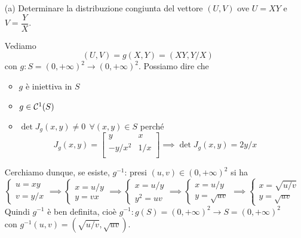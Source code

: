 \Soluzione{}
\begin{enumerate}
\item [(a)] Determinare la distribuzione congiunta del vettore $(U,V)$ ove $U=XY$ e $V=\dfrac{Y}{X}$.

Vediamo
\[
(U,V)=g(X,Y)=(XY,Y/X)
\]
con $g:S=(0,+\infty)^2\to(0,+\infty)^2$. Possiamo dire che
\begin{itemize}
\item $g$ è iniettiva in $S$
\item $g\in\mathcal{C}^1(S)$
\item $\det J_g(x,y)\neq 0\ \ \forall (x,y)\in S$ perché
\[
J_g(x,y)=
\begin{bmatrix}
y & x \\
-y/x^2 & 1/x \\
\end{bmatrix}
\implies \det J_g(x,y)=2y/x
\]
\end{itemize}
Cerchiamo dunque, se esiste, $g^{-1}$: presi $(u,v)\in(0,+\infty)^2$ si ha
\[
\begin{cases}u=xy \\ v=y/x \end{cases}
\implies
\begin{cases}x=u/y \\ y=vx\end{cases} 
\implies
\begin{cases}x=u/y \\ y^2=uv\end{cases} 
\implies
\begin{cases}x=u/y \\ y=\sqrt{uv} \end{cases} 
\implies
\begin{cases}x=\sqrt{u/v} \\ y=\sqrt{uv} \end{cases}
\]
Quindi $g^{-1}$ è ben definita, cioè $g^{-1}:g(S)=(0,+\infty)^2\to S=(0,+\infty)^2$ con $g^{-1}(u,v)=(\sqrt{u/v}, \sqrt{uv})$.


\end{enumerate}
